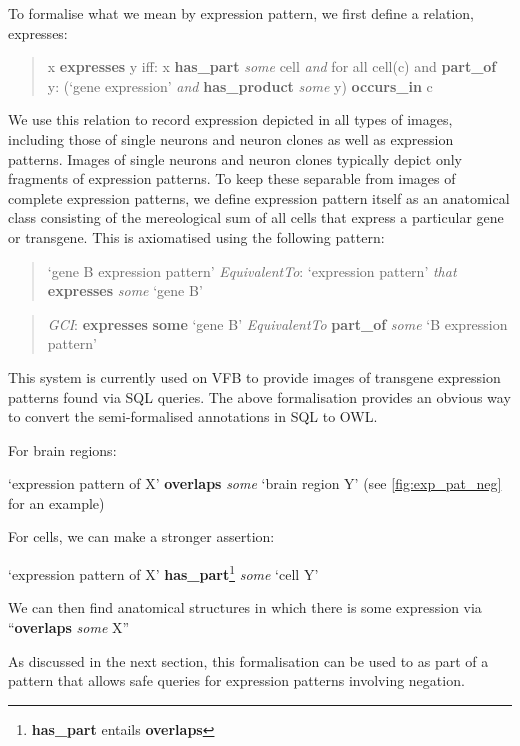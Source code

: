 \documentclass[runningheads,a4paper]{llncs}
\begin{document}
To formalise what we mean by expression pattern, we first define a
relation, expresses:

\begin{quote}
x \textbf{expresses} y iff:  x \textbf{has\_part} \textit{some} cell \textit{and}
for all cell(c) and \textbf{part\_of} y: (`gene expression'
\textit{and} \textbf{has\_product} \textit{some} y)
\textbf{occurs\_in} c  %
\end{quote}

We use this relation to record expression depicted in all types of
images, including those of single neurons and neuron clones as well as
expression patterns. Images of single neurons and neuron clones
typically depict only fragments of expression patterns.  To keep these
separable from images of complete expression patterns, we define
expression pattern itself as an anatomical class consisting of the 
mereological sum of all cells that express a particular gene or
transgene.  This is axiomatised using the following pattern:

\begin{quote}
`gene B expression pattern'
\textit{EquivalentTo}: `expression pattern' \textit{that} \textbf{expresses} \textit{some} `gene
B'\end{quote}
\begin{quote} \textit{GCI}: \textbf{expresses} \textbf{some} `gene B' \textit{EquivalentTo}
\textbf{part\_of} \textit{some} `B expression pattern'
\end{quote}

This system is currently used on VFB to provide images of transgene
expression patterns found via SQL queries. The above formalisation
provides an obvious way to convert the semi-formalised annotations in
SQL to OWL.

For brain regions:

`expression pattern of X' \textbf{overlaps} \textit{some} `brain
region Y'  (see \ref{fig:exp_pat_neg} for an example)

For cells, we can make a stronger assertion:

`expression pattern of X'
\textbf{has\_part}\footnote{\textbf{has\_part} entails \textbf{overlaps}} \textit{some} `cell Y'

We can then find anatomical structures in which there is some
expression via ``\textbf{overlaps} \textit{some} X''

As discussed in the next section, this formalisation can be used to as
part of a pattern that allows safe queries for expression patterns involving negation.
\end{document}
